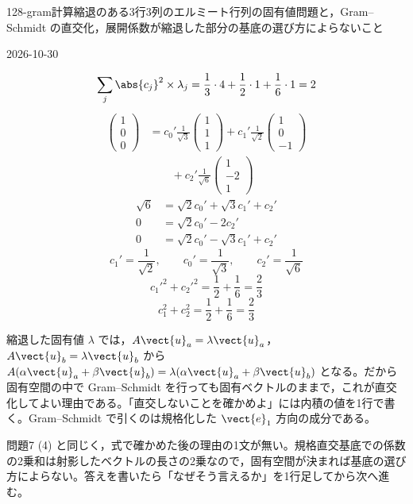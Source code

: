 \documentclass[uplatex,dvipdfmx,a4paper,11pt]{jsarticle}
\begin{document}
\begin{mondai}{128-gram}{計算}{縮退のある3行3列のエルミート行列の固有値問題と，Gram--Schmidt の直交化，展開係数が縮退した部分の基底の選び方によらないこと}
\begin{kotaeutsushi}{2026-10-30}
\begin{align*}
\end{align*}
\[ \sum_{j}\abs{c_{j}}^{2}\times\lambda_{j}=\frac{1}{3}\cdot4+\frac{1}{2}\cdot1+\frac{1}{6}\cdot1=2 \]
\begin{align*}
\begin{pmatrix}1\\0\\0\end{pmatrix}
&=c_{0}'\frac{1}{\sqrt{3}}\begin{pmatrix}1\\1\\1\end{pmatrix}+c_{1}'\frac{1}{\sqrt{2}}\begin{pmatrix}1\\0\\-1\end{pmatrix}\\
&\qquad+c_{2}'\frac{1}{\sqrt{6}}\begin{pmatrix}1\\-2\\1\end{pmatrix}
\end{align*}
\begin{align*}
\sqrt{6}&=\sqrt{2}c_{0}'+\sqrt{3}c_{1}'+c_{2}'\\
0&=\sqrt{2}c_{0}'-2c_{2}'\\
0&=\sqrt{2}c_{0}'-\sqrt{3}c_{1}'+c_{2}'
\end{align*}
\[ c_{1}'=\frac{1}{\sqrt{2}},\qquad c_{0}'=\frac{1}{\sqrt{3}},\qquad c_{2}'=\frac{1}{\sqrt{6}} \]
\[ c_{1}'^{2}+c_{2}'^{2}=\frac{1}{2}+\frac{1}{6}=\frac{2}{3} \]
\[ c_{1}^{2}+c_{2}^{2}=\frac{1}{2}+\frac{1}{6}=\frac{2}{3} \]
\end{kotaeutsushi}
\begin{kizuki}
\item 縮退した固有値 $\lambda$ では，$A\vect{u}_{a}=\lambda\vect{u}_{a}$，$A\vect{u}_{b}=\lambda\vect{u}_{b}$ から $A(\alpha\vect{u}_{a}+\beta\vect{u}_{b})=\lambda(\alpha\vect{u}_{a}+\beta\vect{u}_{b})$ となる。だから固有空間の中で Gram--Schmidt を行っても固有ベクトルのままで，これが直交化してよい理由である。「直交しないことを確かめよ」には内積の値を1行で書く。Gram--Schmidt で引くのは規格化した $\vect{e}_{1}$ 方向の成分である。
\item {} 問題7 (4) と同じく，式で確かめた後の理由の1文が無い。規格直交基底での係数の2乗和は射影したベクトルの長さの2乗なので，固有空間が決まれば基底の選び方によらない。答えを書いたら「なぜそう言えるか」を1行足してから次へ進む。

\end{kizuki}
\end{mondai}
\end{document}
